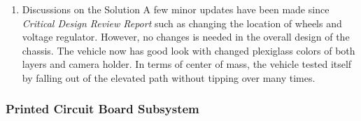 \documentclass[a4paper,12pt]{article}
\begin{document}
\begin{enumerate}
		To satisfy the requirements the holder is built using 4mm plexiglass. The choice satisfies the rigidity and light weight possible. A thinner one would result in less rigidity and increased vibration on the system. The designed structure has the elevation range from 35 cm to 45 cm and a camera angle ranging from $0^o$ to $45^o$. Having manufactured, the camera holder is integrated to the vehicle (\textit{see Figure \ref{fig:chassis}}). After integration, the view of the camera can completely cover the both edges of the path. Lastly LEDs for handshake protocols are also placed on the camera holder at the updated design.\\


	CAD model of the chassis can be seen in \textit{Figure~\ref{fig:chassis}}.


	\begin{figure}[h]
		\caption{Isometric view of the 3D Drawing of the vehicle \label{fig:chassis} }
	\end{figure}

	\item {Discussions on the Solution}
		A few minor updates have been made since \textit{Critical Design Review Report} such as changing the location of wheels and voltage regulator. However, no changes is needed in the overall design of the chassis. The vehicle now has good look with changed plexiglass colors of both layers and camera holder. In terms of center of mass, the vehicle tested itself by falling out of the elevated path without tipping over many times.
	

	\end{enumerate}



\subsubsection{Printed Circuit Board Subsystem}
\end{document}
